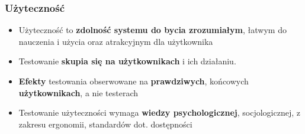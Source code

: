 \documentclass[../main.tex]{subfiles}
\begin{document}
    \subsubsection{Użyteczność}
    \begin{itemize}
        \item Użyteczność to \textbf{zdolność systemu do bycia zrozumiałym}, łatwym do nauczenia i użycia oraz atrakcyjnym dla
        użytkownika
        \item Testowanie \textbf{skupia się na użytkownikach} i ich działaniu.
        \item \textbf{Efekty} testowania obserwowane na \textbf{prawdziwych}, końcowych \textbf{użytkownikach}, a nie testerach
        \item Testowanie użyteczności wymaga \textbf{wiedzy psychologicznej}, socjologicznej, z zakresu ergonomii, standardów dot.
        dostępności
    \end{itemize}
\end{document}
